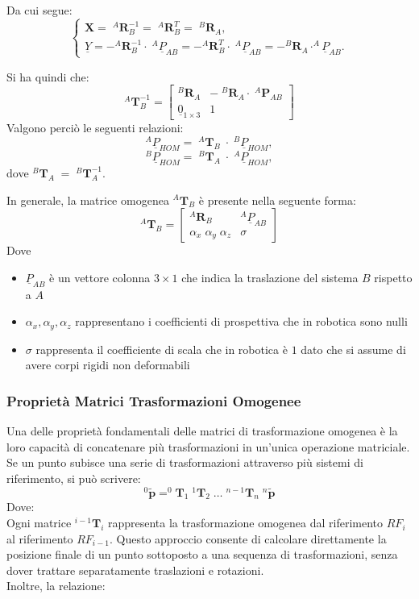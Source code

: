 ﻿\documentclass[11pt, a4paper]{article}
\begin{document}
Da cui segue:
\[
    \begin{cases}
    \boldsymbol{X} = \; ^{A}\mathbf{R}_{B}^{-1} = \; ^{A}\mathbf{R}_{B}^{T} = \; ^{B}\mathbf{R}_{A}, \\
    \underline{Y} = -^{A}\mathbf{R}_{B}^{-1} \cdot \; ^{A}\underline{P}_{AB} = -^{A}\mathbf{R}_{B}^{T} \cdot \; ^{A}\underline{P}_{AB} = -^{B}\mathbf{R}_{A} \cdot ^{A}\underline{P}_{AB}.
    \end{cases}
\]

Si ha quindi che:
\[
    ^{A}\mathbf{T}_{B}^{-1} =
    \begin{bmatrix}
        ^{B}\mathbf{R}_{A} & - \; ^{B}\mathbf{R}_{A} \cdot \; ^{A}\mathbf{P}_{AB} \\
        \underline{0}_{1 \times 3} & 1
    \end{bmatrix}
\]
\newpage
Valgono perciò le seguenti relazioni:
\[
    ^{A}\underline{P}_{HOM} = \; ^{A}\mathbf{T}_{B} \; \cdot \; ^{B}\underline{P}_{HOM},
\]
\[
^{B}\underline{P}_{HOM} = \;^{B}\mathbf{T}_{A} \; \cdot \; ^{A}\underline{P}_{HOM},
\]
dove $ ^{B}\mathbf{T}_{A} \; = \; ^{B}\mathbf{T}_{A}^{-1} $.

In generale, la matrice omogenea $ ^{A}\mathbf{T}_{B} $ è presente nella seguente forma:
\[
    ^{A}\mathbf{T}_{B} =
    \begin{bmatrix}
    ^{A}\mathbf{R}_{B} & ^{A}\underline{P}_{AB} \\
    \alpha_{x} \; \alpha_{y} \; \alpha_{z} & \sigma
    \end{bmatrix}
\]
Dove
\begin{itemize}
    \item \( \underline{P}_{AB} \) è un vettore colonna \( 3 \times 1 \) che indica la traslazione del sistema \( B \) rispetto a \( A \)
    \item $ \alpha_{x}, \alpha_{y}, \alpha_{z} $ rappresentano i coefficienti di prospettiva che in robotica sono nulli
    \item $ \sigma $ rappresenta il coefficiente di scala che in robotica è $ 1 $ dato che si assume di avere corpi rigidi non deformabili
\end{itemize}

\subsubsection{Proprietà Matrici Trasformazioni Omogenee}
Una delle proprietà fondamentali delle matrici di trasformazione omogenea è la loro capacità di concatenare più trasformazioni in un'unica operazione matriciale. Se un punto subisce una serie di trasformazioni attraverso più sistemi di riferimento, si può scrivere:
\[
    ^{0}\tilde{\mathbf{p}} = ^{0}\mathbf{T}_{1} \; ^{1}\mathbf{T}_{2} \; \dots \; ^{n-1}\mathbf{T}_{n} \; ^{n}\tilde{\mathbf{p}}
\]
Dove:\\
Ogni matrice $^{i-1}\mathbf{T}_{i}$ rappresenta la trasformazione omogenea dal riferimento $RF_{i}$ al riferimento $RF_{i-1}$. Questo approccio consente di calcolare direttamente la posizione finale di un punto sottoposto a una sequenza di trasformazioni, senza dover trattare separatamente traslazioni e rotazioni.\\
Inoltre, la relazione:
\end{document}
